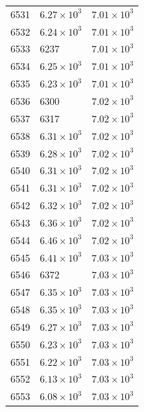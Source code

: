 \begin{table}[H]
\begin{tabular}{lll}
6531 & $\displaystyle 6.27 \times 10^{3}$ & $\displaystyle 7.01 \times 10^{3}$ \\
6532 & $\displaystyle 6.24 \times 10^{3}$ & $\displaystyle 7.01 \times 10^{3}$ \\
6533 & 6237 & $\displaystyle 7.01 \times 10^{3}$ \\
6534 & $\displaystyle 6.25 \times 10^{3}$ & $\displaystyle 7.01 \times 10^{3}$ \\
6535 & $\displaystyle 6.23 \times 10^{3}$ & $\displaystyle 7.01 \times 10^{3}$ \\
6536 & 6300 & $\displaystyle 7.02 \times 10^{3}$ \\
6537 & 6317 & $\displaystyle 7.02 \times 10^{3}$ \\
6538 & $\displaystyle 6.31 \times 10^{3}$ & $\displaystyle 7.02 \times 10^{3}$ \\
6539 & $\displaystyle 6.28 \times 10^{3}$ & $\displaystyle 7.02 \times 10^{3}$ \\
6540 & $\displaystyle 6.31 \times 10^{3}$ & $\displaystyle 7.02 \times 10^{3}$ \\
6541 & $\displaystyle 6.31 \times 10^{3}$ & $\displaystyle 7.02 \times 10^{3}$ \\
6542 & $\displaystyle 6.32 \times 10^{3}$ & $\displaystyle 7.02 \times 10^{3}$ \\
6543 & $\displaystyle 6.36 \times 10^{3}$ & $\displaystyle 7.02 \times 10^{3}$ \\
6544 & $\displaystyle 6.46 \times 10^{3}$ & $\displaystyle 7.02 \times 10^{3}$ \\
6545 & $\displaystyle 6.41 \times 10^{3}$ & $\displaystyle 7.03 \times 10^{3}$ \\
6546 & 6372 & $\displaystyle 7.03 \times 10^{3}$ \\
6547 & $\displaystyle 6.35 \times 10^{3}$ & $\displaystyle 7.03 \times 10^{3}$ \\
6548 & $\displaystyle 6.35 \times 10^{3}$ & $\displaystyle 7.03 \times 10^{3}$ \\
6549 & $\displaystyle 6.27 \times 10^{3}$ & $\displaystyle 7.03 \times 10^{3}$ \\
6550 & $\displaystyle 6.23 \times 10^{3}$ & $\displaystyle 7.03 \times 10^{3}$ \\
6551 & $\displaystyle 6.22 \times 10^{3}$ & $\displaystyle 7.03 \times 10^{3}$ \\
6552 & $\displaystyle 6.13 \times 10^{3}$ & $\displaystyle 7.03 \times 10^{3}$ \\
6553 & $\displaystyle 6.08 \times 10^{3}$ & $\displaystyle 7.03 \times 10^{3}$ \\

\end{tabular}
\end{table}
